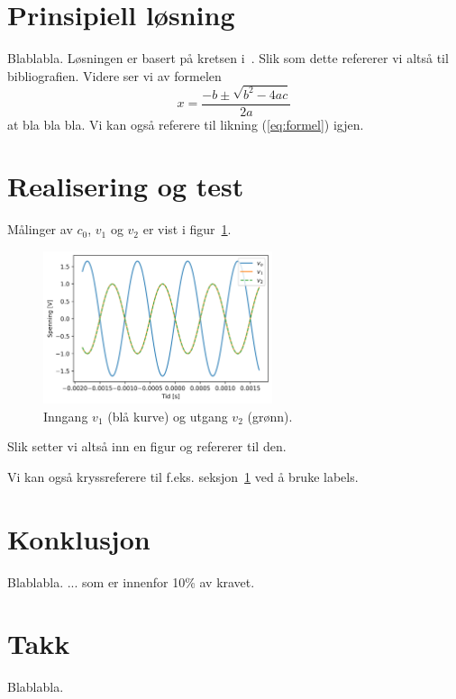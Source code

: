 \documentclass[a4paper,11pt,norsk]{article}
\begin{document}
\section{Prinsipiell løsning}
\label{sec:prinsipielllosning}

Blablabla. Løsningen er basert på kretsen i~\cite[s. 1604]{bibelen}. Slik som dette refererer vi altså til bibliografien. Videre ser vi av formelen
\begin{equation}
  \label{eq:formel}
  x = \frac{-b \pm \sqrt{b^{2}-4ac}}{2a}
\end{equation}
at bla bla bla. Vi kan også referere til likning (\ref{eq:formel}) igjen.

\section{Realisering og test}
\label{sec:realisering}

Målinger av $c_0$, $v_1$ og $v_2$ er vist i figur~\ref{fig:resultat}.
\begin{figure}[htbp]
  \centering
  \includegraphics[width=0.6\textwidth]{skop} 
  \caption{Inngang $v_1$ (blå kurve) og utgang $v_2$ (grønn).}
  \label{fig:resultat}
\end{figure}

Slik setter vi altså inn en figur og refererer til den. 

Vi kan også kryssreferere til f.eks. seksjon~\ref{sec:prinsipielllosning} ved å bruke labels.



\section{Konklusjon}
\label{sec:konklusjon}

Blablabla. ... som er innenfor 10\% av kravet.

\section{Takk}
Blablabla.
\end{document}
